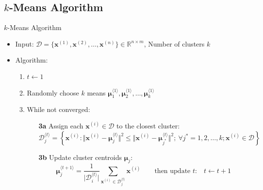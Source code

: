 \subsection{$k$-Means Algorithm}

\begin{frame}{$k$-Means Algorithm}{}\important
	\vspace*{2mm}
	\begin{itemize}
		\item Input: $\mathcal{D} = \{ \bm{x}^{(1)}, \bm{x}^{(2)}, \dots, \bm{x}^{(n)} \} \in \mathbb{R}^{n \times m}$,
			Number of clusters $k$	
		\item Algorithm:
		\begin{enumerate}
			\item $t \longleftarrow 1$
			\item Randomly choose $k$ means $\bm{\mu}_1^{\langle 1 \rangle}, \bm{\mu}_2^{\langle 1 \rangle}, \dots, \bm{\mu}_k^{\langle 1 \rangle}$ 
			\item While not converged:
			\begin{itemize}
				\item[\textbf{3a}] Assign each $\bm{x}^{(i)} \in \mathcal{D}$ to the closest cluster:
				{\footnotesize
				\begin{equation*}
					\mathcal{D}_j^{\langle t \rangle}
						= \left\{
							\bm{x}^{(i)} : \Vert \bm{x}^{(i)} - \bm{\mu}_j^{\langle t \rangle} \Vert^2 \le
							\Vert \bm{x}^{(i)} - \bm{\mu}_{j^*}^{\langle t \rangle} \Vert^2;\
							\forall j^* = 1, 2, \dots, k; \bm{x}^{(i)} \in \mathcal{D}
						\right\}
				\end{equation*}}
				\item[\textbf{3b}] Update cluster centroids $\bm{\mu}_j$:
				{\footnotesize
				\begin{equation*}
					\bm{\mu}_{j}^{\langle t+1 \rangle} =
						\frac{1}{\vert \mathcal{D}_i^{\langle t \rangle} \vert} \sum_{\bm{x}^{(i)} \in \mathcal{D}_j^{\langle t \rangle}} \bm{x}^{(i)}
					\qquad\text{then update $t$:}\quad t \longleftarrow t + 1
				\end{equation*}}
			\end{itemize}
		\end{enumerate}
	\end{itemize}
\end{frame}


